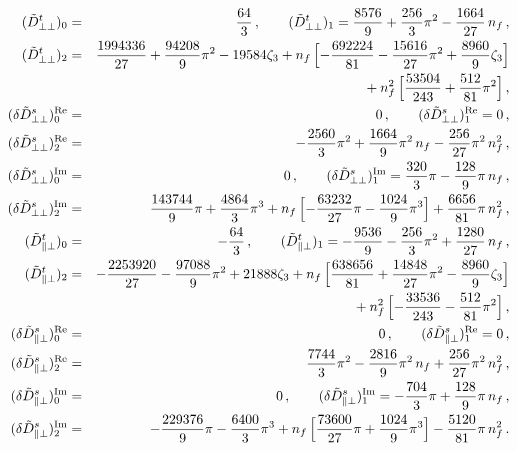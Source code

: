 \documentclass[12pt]{article}
\numberwithin{equation}{section}
\newcommand{\1}[1]{\mathbf{1}^{#1}}
\newcommand{\2}[1]{\mathbf{2}^{#1}}
\newcommand{\3}[1]{\mathbf{3}^{#1}}
\newcommand{\4}[1]{\mathbf{4}^{#1}}
\newcommand{\5}[1]{\mathbf{5}^{#1}}
\newcommand{\tD}{\tilde{D}}
\newcommand{\nnb}{\nonumber}
\newcommand{\TT}{{\perp\perp}}
\newcommand{\PT}{{\parallel\perp}}
\newcommand{\NEQN}[1]{\nnb}
\begin{document}
\begin{eqnarray}
 (\tD^t_\TT)_{0}&=&
  \frac{64}{3}\,,
  \qquad
(\tD^t_\TT)_{1}=
\frac{8576}{9}+\frac{256}{3} \pi^2-\frac{1664}{27}\, n_f\,,
\nonumber\\
(\tD^t_\TT)_{2}&=&
\frac{1994336}{27}+\frac{94208}{9} \pi^2-19584  \zeta_{3}
+n_f\, \Bigl[-\frac{692224}{81}-\frac{15616}{27} \pi^2+\frac{8960}{9}  \zeta_{3}\Bigr]
\nonumber\\
&&{}+n_f^2\, \Bigl[\frac{53504}{243}+\frac{512}{81} \pi^2\Bigr]\,,
\nonumber\\
(\delta \tD^s_\TT)^{\text{Re}}_{0}  &=&0\,, 
\qquad
(\delta \tD^s_\TT)^{\text{Re}}_{1}  =0\,, 
\nonumber\\
 (\delta \tD^s_\TT)^{\text{Re}}_{2}  &=&
-\frac{2560}{3} \pi^2 
+\frac{1664}{9} \pi^2\, n_f
-\frac{256}{27} \pi^2\, n_f^2\,,
\nonumber\\
 (\delta \tD^s_\TT)^{\text{Im}}_0&=&0\,, 
\qquad
(\delta \tD^s_\TT)^{\text{Im}}_1=
\frac{320}{3} \pi-\frac{128}{9} \pi\, n_f\,,
\nonumber\\
(\delta \tD^s_\TT)^{\text{Im}}_2&=&
\frac{143744}{9} \pi+\frac{4864}{3} \pi^3
+n_f\, \Bigl[-\frac{63232}{27} \pi-\frac{1024}{9} \pi^3\Bigr]
+\frac{6656}{81} \pi\, n_f^2\,,
\nonumber\\
(\tD^t_\PT)_{0}&=&
-\frac{64}{3}\,, 
\qquad
(\tD^t_\PT)_{1}=
-\frac{9536}{9}-\frac{256}{3} \pi^2+\frac{1280}{27}\, n_f\,,
\nonumber\\
(\tD^t_\PT)_{2}&=&
-\frac{2253920}{27}-\frac{97088}{9} \pi^2+21888  \zeta_{3}
+n_f\, \Bigl[\frac{638656}{81}+\frac{14848}{27} \pi^2-\frac{8960}{9}  \zeta_{3}\Bigr]
\nonumber\\
&&{}+n_f^2\, \Bigl[-\frac{33536}{243}-\frac{512}{81} \pi^2\Bigr]\,,
\nonumber\\
(\delta \tD^s_\PT)^{\text{Re}}_{0}  &=&0\,, 
\qquad
(\delta \tD^s_\PT)^{\text{Re}}_{1}  =0\,, 
\nonumber\\
 (\delta \tD^s_\PT)^{\text{Re}}_{2} & =&
\frac{7744}{3} \pi^2 
-\frac{2816}{9} \pi^2\, n_f
+\frac{256}{27} \pi^2\, n_f^2\,,
\nonumber\\
(\delta \tD^s_\PT)^{\text{Im}}_0&=&0\,, 
\qquad
(\delta \tD^s_\PT)^{\text{Im}}_1=
-\frac{704}{3} \pi+\frac{128}{9} \pi\, n_f\,,
\nonumber\\
(\delta \tD^s_\PT)^{\text{Im}}_2&=&
-\frac{229376}{9} \pi-\frac{6400}{3} \pi^3
+n_f\, \Bigl[\frac{73600}{27} \pi+\frac{1024}{9} \pi^3\Bigr]
-\frac{5120}{81} \pi\, n_f^2\,.
\end{eqnarray}
\end{document}
